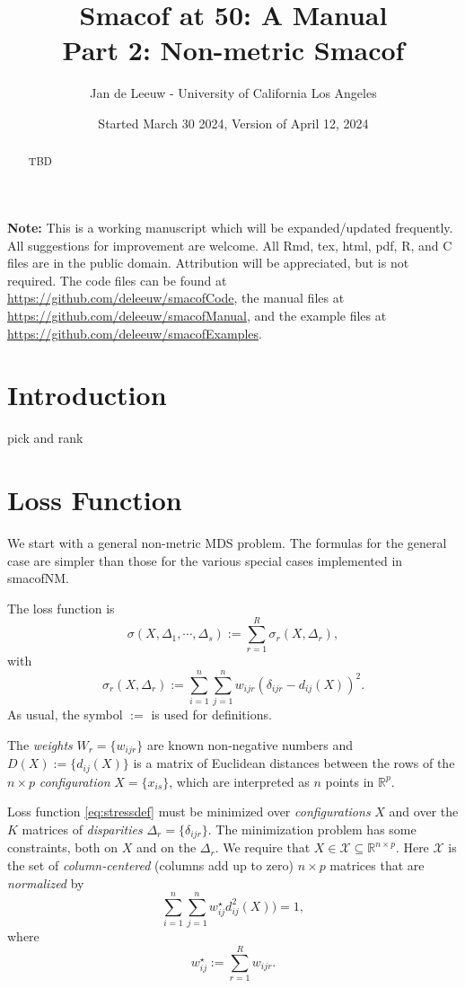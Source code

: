 \documentclass[
  12pt,
]{article}
\title{Smacof at 50: A Manual\\
Part 2: Non-metric Smacof}
\author{Jan de Leeuw - University of California Los Angeles}
\date{Started March 30 2024, Version of April 12, 2024}
\newcommand{\sectionbreak}{\clearpage}
\begin{document}
\maketitle
\begin{abstract}
TBD
\end{abstract}

{
\setcounter{tocdepth}{4}
\tableofcontents
}
\textbf{Note:} This is a working manuscript which will be expanded/updated
frequently. All suggestions for improvement are welcome. All Rmd, tex,
html, pdf, R, and C files are in the public domain. Attribution will be
appreciated, but is not required. The code files can be found at
\url{https://github.com/deleeuw/smacofCode}, the manual files at
\url{https://github.com/deleeuw/smacofManual}, and the example files
at \url{https://github.com/deleeuw/smacofExamples}.

\sectionbreak

\section{Introduction}\label{introduction}

pick and rank

\section{Loss Function}\label{loss-function}

We start with a general non-metric MDS problem. The formulas for the general case are simpler than those for the various special cases implemented
in smacofNM.

The loss function is
\begin{equation}
\sigma(X,\Delta_1,\cdots,\Delta_s):=\sum_{r=1}^R\sigma_r(X,\Delta_r),
\label{eq:stressdef}
\end{equation}
with
\begin{equation}
\sigma_r(X,\Delta_r):=\sum_{i=1}^n\sum_{j=1}^n w_{ijr}(\delta_{ijr}-d_{ij}(X))^2.
\label{eq:rstressdef}
\end{equation}
As usual, the symbol \(:=\) is used for definitions.

The \emph{weights} \(W_r=\{w_{ijr}\}\) are known non-negative
numbers and \(D(X):=\{d_{ij}(X)\}\) is a matrix of Euclidean distances
between the rows of the \(n\times p\) \emph{configuration} \(X=\{x_{is}\}\), which are interpreted as \(n\) points in \(\mathbb{R}^p\).

Loss function \eqref{eq:stressdef} must be minimized over \emph{configurations} \(X\) and over the \(K\) matrices of \emph{disparities} \(\Delta_r=\{\delta_{ijr}\}\). The minimization problem has some constraints, both on \(X\) and on the \(\Delta_r\).
We require that \(X\in\mathcal{X}\subseteq\mathbb{R}^{n\times p}\). Here \(\mathcal{X}\) is the set of \emph{column-centered} (columns add up to zero) \(n\times p\) matrices that are \emph{normalized} by
\begin{equation}
\sum_{i=1}^n\sum_{j=1}^n w_{ij}^\star d_{ij}^2(X))=1,
\label{eq:xscale}
\end{equation}
where
\begin{equation}
w_{ij}^\star:=\sum_{r=1}^R w_{ijr}.
\label{eq:wstardef}
\end{equation}
\end{document}
